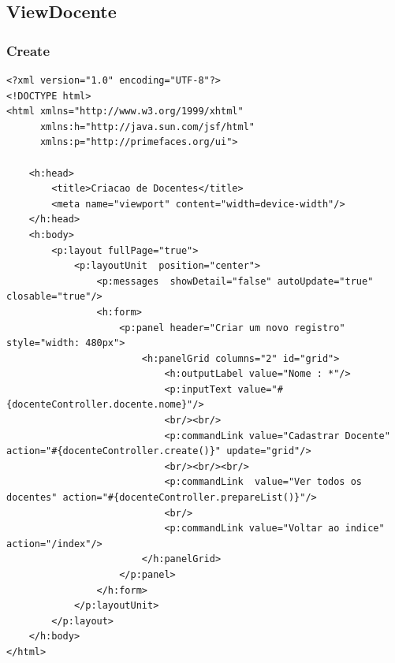 \documentclass[12pt,a4paper]{article}
\begin{document}
\lstset{language=HTML}
\subsection{ViewDocente}
\subsubsection{Create}
\label{subsubsectionDocenteCreate}
\begin{lstlisting}
<?xml version="1.0" encoding="UTF-8"?>
<!DOCTYPE html>
<html xmlns="http://www.w3.org/1999/xhtml"
      xmlns:h="http://java.sun.com/jsf/html"
      xmlns:p="http://primefaces.org/ui">

    <h:head>
        <title>Criacao de Docentes</title>
        <meta name="viewport" content="width=device-width"/>
    </h:head>
    <h:body>
        <p:layout fullPage="true"> 
            <p:layoutUnit  position="center">
                <p:messages  showDetail="false" autoUpdate="true" closable="true"/>
                <h:form>
                    <p:panel header="Criar um novo registro" style="width: 480px">  
                        <h:panelGrid columns="2" id="grid">  
                            <h:outputLabel value="Nome : *"/>  
                            <p:inputText value="#{docenteController.docente.nome}"/>
                            <br/><br/>
                            <p:commandLink value="Cadastrar Docente" action="#{docenteController.create()}" update="grid"/>
                            <br/><br/><br/>
                            <p:commandLink  value="Ver todos os docentes" action="#{docenteController.prepareList()}"/>
                            <br/>
                            <p:commandLink value="Voltar ao indice" action="/index"/>
                        </h:panelGrid>
                    </p:panel>
                </h:form>
            </p:layoutUnit>
        </p:layout>
    </h:body>
</html>
\end{lstlisting}
\end{document}

